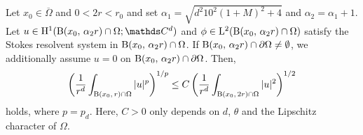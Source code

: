 \begin{lem}
  \label{lem:reverseHoelder}
  Let $x_0 \in \overline\Omega$ and $0 < 2r < r_0$ and set $\alpha_1 = \sqrt{d^2 10^2 (1 + M)^2 + 4}$ and $\alpha_2 = \alpha_1 + 1$.
  Let $u \in \HH^1(\BB(x_0,\,  \alpha_2 r) \cap \Omega; \C^d)$ and $\phi \in \mathrm{L}^2(\mathrm{B}(x_0,\, \alpha_2 r) \cap \Omega)$ satisfy the Stokes resolvent system in $\mathrm{B}(x_0,\, \alpha_2 r) \cap \Omega$. 
  If $\mathrm{B}(x_0,\, \alpha_2 r) \cap \partial \Omega \neq \emptyset $, we additionally assume $u = 0$ on $\mathrm{B}(x_0,\, \alpha_2 r) \cap \partial\Omega$.
  Then,
  \begin{align}
    \label{eq:reverseHoelder}
    \bigg( \frac{1}{r^{d}} \int_{\mathrm{B}(x_0,\, r) \cap \Omega} |u|^p \bigg)^{1/p} \leq C \, \bigg( \frac{1}{r^{d}} \int_{\mathrm{B}(x_0,\, 2 r) \cap \Omega} |u|^2 \bigg)^{1/2}
  \end{align}
  holds, where $p = p_d$.
  Here, $C > 0$ only depends on $d$, $\theta$ and the Lipschitz character of $\Omega$.
\end{lem}

